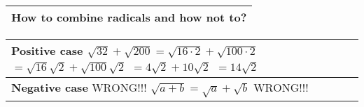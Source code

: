 \begin{small}
    \begin{tabularx}{1\textwidth}{
            p{}
        }
        \toprule
        How to combine radicals and how not to?
        \\
        \bottomrule

    \end{tabularx}
\end{small}

\begin{small}
    \begin{tabularx}{1\textwidth}{
            p{}
        }
        \toprule
        \makecell{
            \textbf{Positive case}\\
            $ \sqrt{32} + \sqrt{200} = \sqrt{16 \cdot 2} + \sqrt{100 \cdot 2} $\\
            $ = \sqrt{16}\sqrt{2} + \sqrt{100}\sqrt{2} $\\
            $ = 4\sqrt{2} + 10\sqrt{2} $\\
            $ = 14\sqrt{2} $\\
        }
        \\
        \midrule
        \makecell{
            \textbf{Negative case}\\
            $ \text{WRONG!!! } \sqrt{a + b} = \sqrt{a} + \sqrt{b} \text{ WRONG!!! } $\\
        }
        \\
        \bottomrule
    \end{tabularx}
\end{small}

